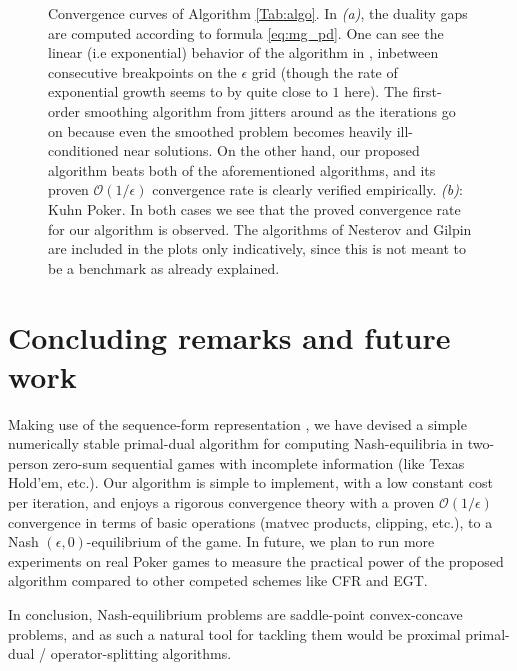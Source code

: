 \documentclass[a4paper,9pt]{extarticle}
\begin{document}
\begin{figure}[!htpb]
  \caption{Convergence curves of Algorithm
    \ref{Tab:algo}. In \textit{(a)}, the duality gaps
    are computed according to formula \eqref{eq:mg_pd}. One can see
    the linear (i.e exponential) behavior of the algorithm in
    \cite{gilpinfirst}, inbetween consecutive breakpoints on the
    $\epsilon$ grid (though the rate of exponential growth seems to by
    quite close to $1$ here). The first-order smoothing algorithm from
    \cite{nesterov2005a} jitters around as the iterations go on
    because even the smoothed problem becomes heavily ill-conditioned
    near solutions. On the other hand, our proposed
    algorithm beats both of the aforementioned algorithms, and
  its proven $\mathcal{O}(1/\epsilon)$ convergence rate is clearly
  verified empirically. \textit{(b)}: Kuhn Poker. In both cases we see
  that the proved convergence rate for our algorithm is observed. The
  algorithms of Nesterov and Gilpin are included in the plots only
  indicatively, since this is not meant to be a benchmark as already
  explained.}
  \label{Tab:dgap_curve}
\end{figure}

\section{Concluding remarks and future work}
Making use of the sequence-form representation
\cite{koller1992complexity,von1996efficient,vonequilibrium}, we have
devised a simple numerically stable primal-dual algorithm for computing
Nash-equilibria in two-person zero-sum sequential games with
incomplete information (like Texas Hold'em, etc.). Our algorithm is
simple to implement, with a low constant cost per iteration, and
enjoys a rigorous convergence theory with a proven
$\mathcal{O}(1/\epsilon)$ convergence in terms of basic operations
(matvec products, clipping, etc.), to a Nash
$(\epsilon,0)$-equilibrium of the game. In future, we plan to run more
experiments on real Poker games to measure the practical power of the
proposed algorithm compared to other competed schemes like CFR and
EGT.

In conclusion, Nash-equilibrium problems are saddle-point
convex-concave problems, and as such a natural tool
for tackling them would be proximal primal-dual / operator-splitting
algorithms. %

\end{document}
